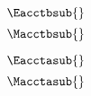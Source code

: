

\begin{landscape}

\linespread{1}


\sectionsep{}

{
  \begin{equation}
  \Eacctbsub{}
  \end{equation}
}
{
  \begin{equation}
  \Macctbsub{}
  \end{equation}
}

\sectionsep{}


{
  \begin{equation}
  \Eacctasub{}
  \end{equation}
}
{
  \begin{equation}
  \Macctasub{}
  \end{equation}
}

\sectionsep{}

\end{landscape}